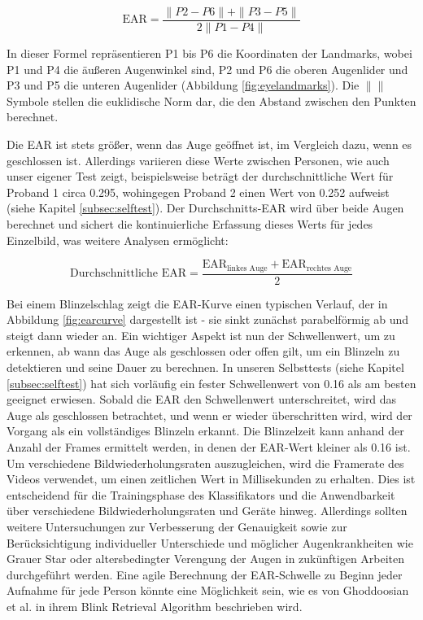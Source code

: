 \begin{equation}
	\text{EAR} = \frac{{\|P2 - P6\| + \|P3 - P5\|}}{{2\|P1 - P4\|}}
\end{equation}

In dieser Formel repräsentieren P1 bis P6 die Koordinaten der Landmarks, wobei P1 und P4 die äußeren Augenwinkel sind, P2 und P6 die oberen Augenlider und P3 und P5 die unteren Augenlider (Abbildung \ref{fig:eyelandmarks}). Die $ \| \| $ Symbole stellen die euklidische Norm dar, die den Abstand zwischen den Punkten berechnet.

Die EAR ist stets größer, wenn das Auge geöffnet ist, im Vergleich dazu, wenn es geschlossen ist. Allerdings variieren diese Werte zwischen Personen, wie auch unser eigener Test zeigt, beispielsweise beträgt der durchschnittliche Wert für Proband 1 circa 0.295, wohingegen Proband 2 einen Wert von 0.252 aufweist (siehe Kapitel \ref{subsec:selftest}). Der Durchschnitts-EAR wird über beide Augen berechnet und sichert die kontinuierliche Erfassung dieses Werts für jedes Einzelbild, was weitere Analysen ermöglicht:

\begin{equation}
	\text{Durchschnittliche EAR} = \frac{{\text{EAR}_{\text{linkes Auge}} + \text{EAR}_{\text{rechtes Auge}}}}{2}
\end{equation}

Bei einem Blinzelschlag zeigt die EAR-Kurve einen typischen Verlauf, der in Abbildung \ref{fig:earcurve} dargestellt ist - sie sinkt zunächst parabelförmig ab und steigt dann wieder an. Ein wichtiger Aspekt ist nun der Schwellenwert, um zu erkennen, ab wann das Auge als geschlossen oder offen gilt, um ein Blinzeln zu detektieren und seine Dauer zu berechnen. In unseren Selbsttests (siehe Kapitel \ref{subsec:selftest}) hat sich vorläufig ein fester Schwellenwert von 0.16 als am besten geeignet erwiesen. Sobald die EAR den Schwellenwert unterschreitet, wird das Auge als geschlossen betrachtet, und wenn er wieder überschritten wird, wird der Vorgang als ein vollständiges Blinzeln erkannt. Die Blinzelzeit kann anhand der Anzahl der Frames ermittelt werden, in denen der EAR-Wert kleiner als 0.16 ist. Um verschiedene Bildwiederholungsraten auszugleichen, wird die Framerate des Videos verwendet, um einen zeitlichen Wert in Millisekunden zu erhalten. Dies ist entscheidend für die Trainingsphase des Klassifikators und die Anwendbarkeit über verschiedene Bildwiederholungsraten und Geräte hinweg.  Allerdings sollten weitere Untersuchungen zur Verbesserung der Genauigkeit sowie zur Berücksichtigung individueller Unterschiede und möglicher Augenkrankheiten wie Grauer Star oder altersbedingter Verengung der Augen in zukünftigen Arbeiten durchgeführt werden. Eine agile Berechnung der EAR-Schwelle zu Beginn jeder Aufnahme für jede Person könnte eine Möglichkeit sein, wie es von Ghoddoosian et al. \cite{GH19} in ihrem \glqq Blink Retrieval Algorithm\grqq{} beschrieben wird.

